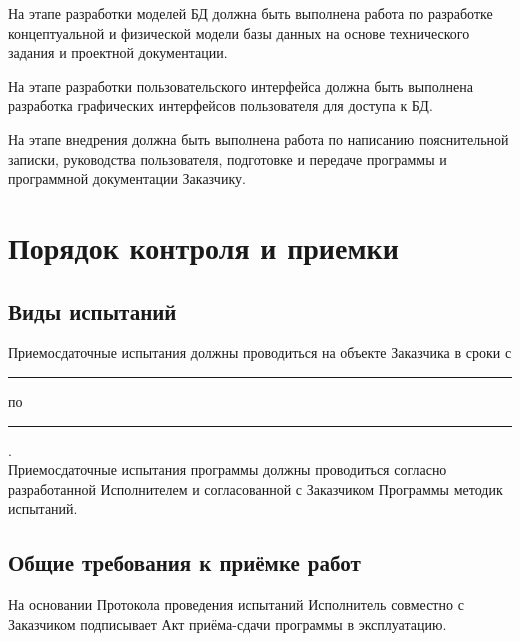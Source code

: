     На этапе разработки моделей БД должна быть выполнена работа по разработке концептуальной и физической модели базы данных на основе технического задания и проектной документации.

    На этапе разработки пользовательского интерфейса должна быть выполнена разработка графических интерфейсов пользователя для доступа к БД.

    На этапе внедрения должна быть выполнена работа по написанию пояснительной записки, руководства пользователя, подготовке и передаче программы и программной документации Заказчику.
\section{Порядок контроля и приемки}
  \subsection{Виды испытаний}
    Приемосдаточные испытания должны проводиться на объекте Заказчика в сроки с \rule{3cm}{.1pt} по \rule{3cm}{.1pt}  .\\
    Приемосдаточные испытания программы должны проводиться согласно разработанной Исполнителем и согласованной с Заказчиком Программы методик испытаний.
  \subsection{Общие требования к приёмке работ}
    На основании Протокола проведения испытаний Исполнитель совместно с Заказчиком подписывает Акт приёма-сдачи программы в эксплуатацию.
\endinput
